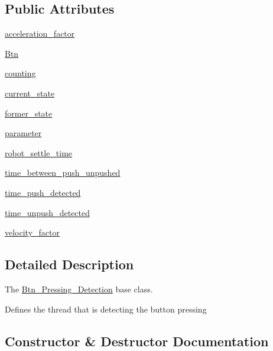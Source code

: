 \subsection*{Public Attributes}
\begin{DoxyCompactItemize}
\item 
\hyperlink{a00029_abd224cfc80b136898df89af7812fa8d5}{acceleration\+\_\+factor}
\item 
\hyperlink{a00029_a921d77252b5d9e078d906e8c2b745b49}{Btn}
\item 
\hyperlink{a00029_a32ff858bedd6a5ac76421d6a454f695c}{counting}
\item 
\hyperlink{a00029_acc53c2cac20bdbeee95a9059618d7c25}{current\+\_\+state}
\item 
\hyperlink{a00029_a256837dfa4a6a26c2b77dd9795cf8769}{former\+\_\+state}
\item 
\hyperlink{a00029_a0d71b5c1dcca8d3fee88d6a11d3e2071}{parameter}
\item 
\hyperlink{a00029_a153ea6721b57c14eea55728d46eae779}{robot\+\_\+settle\+\_\+time}
\item 
\hyperlink{a00029_a29a256a520b85082249eea9f0bae5508}{time\+\_\+between\+\_\+push\+\_\+unpushed}
\item 
\hyperlink{a00029_a72e7aa31ee9f2fbbbb3afdca9179cb28}{time\+\_\+push\+\_\+detected}
\item 
\hyperlink{a00029_acd1caad5b97caefebda2828b348c8100}{time\+\_\+unpush\+\_\+detected}
\item 
\hyperlink{a00029_a082e6ba9804a6094336b4c267262460e}{velocity\+\_\+factor}
\end{DoxyCompactItemize}


\subsection{Detailed Description}
The \hyperlink{a00029}{Btn\+\_\+\+Pressing\+\_\+\+Detection} base class. 

Defines the thread that is detecting the button pressing 

\subsection{Constructor \& Destructor Documentation}
\mbox{\label{a00029_ab81832d78db80da2cf38fa604fe38edb}} 
